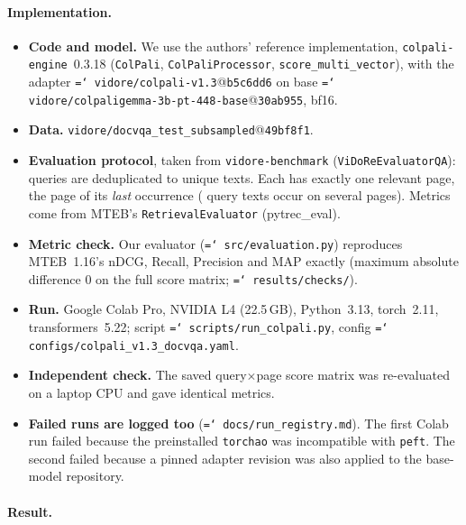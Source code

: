 \documentclass[11pt,a4paper]{article}
\newcommand{\lbl}[2]{\textsf{\scriptsize\textcolor{#1}{[#2]}}}
\newcommand{\Mea}{\lbl{tagM}{Measured}}
\newcommand{\file}[1]{\texttt{\small\hyphenchar\font=`\/ #1}}
\begin{document}
\paragraph{Implementation.}
\begin{itemize}
  \item \textbf{Code and model.} We use the authors' reference implementation, \texttt{colpali-engine}~0.3.18 (\texttt{ColPali}, \texttt{ColPaliProcessor}, \texttt{score\_multi\_vector}), with the adapter \file{vidore/colpali-v1.3}@\texttt{b5c6dd6} on base \file{vidore/colpaligemma-3b-pt-448-base}@\texttt{30ab955}, bf16.
  \item \textbf{Data.} \texttt{vidore/docvqa\_test\_subsampled}@\texttt{49bf8f1}.
  \item \textbf{Evaluation protocol}, taken from \texttt{vidore-benchmark} (\texttt{ViDoReEvaluatorQA}): queries are deduplicated to \nQueries{} unique texts. Each has exactly one relevant page, the page of its \emph{last} occurrence (\nDup{} query texts occur on several pages). Metrics come from MTEB's \texttt{RetrievalEvaluator} (pytrec\_eval).
  \item \textbf{Metric check.} Our evaluator (\file{src/evaluation.py}) reproduces MTEB~1.16's nDCG, Recall, Precision and MAP exactly (maximum absolute difference 0 on the full score matrix; \file{results/checks/}).
  \item \textbf{Run.} Google Colab Pro, NVIDIA L4 (22.5\,GB), Python~3.13, torch~2.11, transformers~5.22; script \file{scripts/run\_colpali.py}, config \file{configs/colpali\_v1.3\_docvqa.yaml}.
  \item \textbf{Independent check.} The saved query$\times$page score matrix was re-evaluated on a laptop CPU and gave identical metrics.
  \item \textbf{Failed runs are logged too} (\file{docs/run\_registry.md}). The first Colab run failed because the preinstalled \texttt{torchao} was incompatible with \texttt{peft}. The second failed because a pinned adapter revision was also applied to the base-model repository.
\end{itemize}

\paragraph{Result.}
\begin{table}[!htbp]\centering\small

\caption{Published vs measured, full DocVQA set. \Mea{} values from \file{results/*/metrics.json}.}\label{tab:repro}
\end{table}
\end{document}
